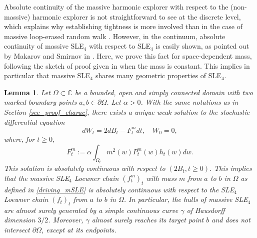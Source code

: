 \documentclass{article}
\newtheorem{lemma}[theorem]{Lemma}
\theoremstyle{definition}
\theoremstyle{remark}
\theoremstyle{remark}
\begin{document}
Absolute continuity of the massive harmonic explorer with respect to the (non-massive) harmonic explorer is not straightforward to see at the discrete level, which explains why establishing tightness is more involved than in the case of massive loop-erased random walk \cite{mLERW}. However, in the continuum, absolute continuity of massive SLE$_4$ with respect to SLE$_4$ is easily shown, as pointed out by Makarov and Smirnov in \cite{off_SLE}. Here, we prove this fact for space-dependent mass, following the sketch of proof given in \cite[Section~3.2]{off_SLE} when the mass is constant. This implies in particular that massive SLE$_4$ shares many geometric properties of SLE$_4$.

\begin{lemma} \label{lemma_abscont_SLE}
    Let $\Omega \subset \mathbb{C}$ be a bounded, open and simply connected domain with two marked boundary points $a, b \in \partial \Omega$. Let $\alpha > 0$. With the same notations as in Section \ref{sec_proof_charac}, there exists a unique weak solution to the stochastic differential equation
    \begin{equation*}
        dW_t = 2dB_t - F_t^m dt, \quad W_0=0,
    \end{equation*}
    where, for $t \geq 0$,
    \begin{equation*}
        F_t^m := \alpha \int_{\Omega_t} m^2(w)P_t^m(w)h_t(w) dw.
    \end{equation*}
    This solution is absolutely continuous with respect to $(2B_t, t \geq 0)$. This implies that the massive SLE$_4$ Loewner chain $(f_t^m)_t$ with mass $m$ from $a$ to $b$ in $\Omega$ as defined in \eqref{driving_mSLE} is absolutely continuous with respect to the SLE$_4$ Loewner chain $(f_t)_t$ from $a$ to $b$ in $\Omega$. In particular, the hulls of massive SLE$_4$ are almost surely generated by a simple continuous curve $\gamma$ of Hausdorff dimension $3/2$. Moreover, $\gamma$ almost surely reaches its target point $b$ and does not intersect $\partial \Omega$, except at its endpoints.
\end{lemma}
\end{document}
